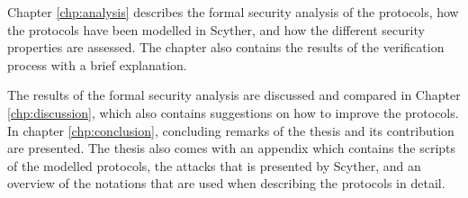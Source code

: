 Chapter \ref{chp:analysis} describes the formal security analysis of the protocols, how the protocols have been modelled in Scyther, and how the different security properties are assessed. The chapter also contains the results of the verification process with a brief explanation.

The results of the formal security analysis are discussed and compared in Chapter \ref{chp:discussion}, which also contains suggestions on how to improve the protocols.  In chapter \ref{chp:conclusion}, concluding remarks of the thesis and its contribution are presented. The thesis also comes with an appendix which contains the scripts of the modelled protocols, the attacks that is presented by Scyther, and an overview of the notations that are used when describing the protocols in detail.